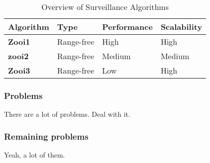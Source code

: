   \begin{table}[H]
  \renewcommand{\arraystretch}{1.3}
  \caption{Overview of Surveillance Algorithms}
  \label{table_example}
  \centering
    \begin{tabular}{|l|l|l|l|}
    \hline
    \bfseries Algorithm & \bfseries Type & \bfseries Performance & \bfseries Scalability\\
    \hline
    \bfseries Zooi1 & Range-free & High & High\\\hline
    \bfseries zooi2 & Range-free & Medium & Medium\\\hline
    \bfseries Zooi3 & Range-free & Low  & High\\\hline
    \end{tabular}
  \end{table}


\subsubsection{Problems}
There are a lot of problems. Deal with it. 


\subsubsection{Remaining problems}
Yeah, a lot of them. 












